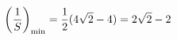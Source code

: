 \documentclass[preview]{standalone}
\begin{document}
\begin{align*}
\special{dvisvgm:raw <g id='unique000'>}\left(\frac{1}{S}\right)_{\min}=\frac{1}{2}(4\sqrt2-4)=2\sqrt2-2\special{dvisvgm:raw </g>}
\end{align*}
\end{document}

